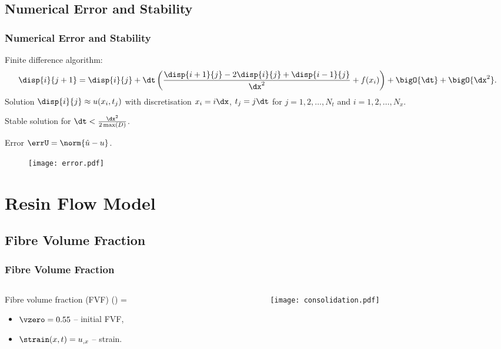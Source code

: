 \documentclass[compress]{beamer}%
\newenvironment{myalign}
{\align\color{\notcolor}}
{
  \nonumber
  \endalign
  \vspace{-1em}
}
\begin{document}
\subsection{Numerical Error and Stability}
\begin{frame}
\frametitle{Numerical Error and Stability}

Finite difference algorithm:
\begin{align}
  \disp{i}{j+1}  =   \disp{i}{j} + \dt\left(\frac{\disp{i+1}{j} - 2\disp{i}{j} + \disp{i-1}{j}}{\dx^2}   + f(x_i) \right) +
\bigO{\dt} + \bigO{\dx^2}. \nonumber
   \label{eq:findiff-alg}
\end{align}
%
Solution $\disp{i}{j}\approx u(x_i,t_j)$ with discretisation
$ x_i = i\dx$, $ t_j = j\dt$ for $j = 1, 2, \dots, N_t$ and
$i = 1, 2, \dots, N_x$.

Stable solution for $  \dt < \frac{\dx^2}{2\max(D)}$.

Error $\errU = \norm{\hat{u} - u}$.
%
\begin{figure}
  \centering
  \texttt{[image: error.pdf]}
  \label{fig:error-analysis}
\end{figure}

\end{frame}


\section{Resin Flow Model}



\subsection{Fibre Volume Fraction}

\begin{frame}
  \frametitle{Fibre Volume Fraction}

  \begin{columns}
    \begin{column}{0.6\linewidth}
      Fibre volume fraction (FVF)
        \begin{myalign} 
          \vfrac(\strain) = 
        \end{myalign}
        \begin{itemize}
        \item $\vzero=0.55$ -- initial FVF,
        \item $\strain(x,t) = u_{,x}$ -- strain.
        \end{itemize}
    \end{column}
    \begin{column}{0.4\linewidth}
      \texttt{[image: consolidation.pdf]}
    \end{column}
  \end{columns}
\end{frame}
\end{document}
